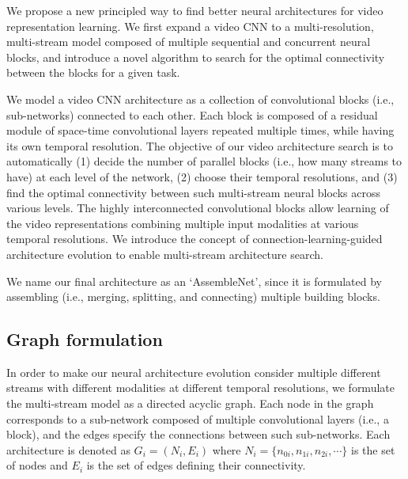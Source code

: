 \documentclass{article} \usepackage{iclr2020_conference,times}
\begin{document}
We propose a new principled way to find better neural architectures for video representation learning. We first expand a video CNN to a multi-resolution, multi-stream model composed of multiple sequential and concurrent neural blocks, and introduce a novel algorithm to search for the optimal connectivity between the blocks for a given task.




We model a video CNN architecture as a collection of convolutional blocks (i.e., sub-networks) connected to each other.
Each block is composed of a residual module of space-time convolutional layers repeated multiple times, while having its own temporal resolution. 
The objective of our video architecture search is to automatically (1) decide the number of parallel blocks (i.e., how many streams to have) at each level of the network, (2) choose their temporal resolutions, and (3) find the optimal connectivity between such multi-stream neural blocks across various levels. 
The highly interconnected convolutional blocks allow learning of the video representations combining multiple input modalities at various temporal resolutions. We introduce the concept of connection-learning-guided architecture evolution to enable multi-stream architecture search.



















We name our final architecture as an `AssembleNet', since it is formulated by assembling (i.e., merging, splitting, and connecting) multiple building blocks. 







\subsection{Graph formulation}

In order to make our neural architecture evolution consider multiple different streams with different modalities at different temporal resolutions, we formulate the multi-stream model as a directed acyclic graph. Each node in the graph corresponds to a sub-network composed of multiple convolutional layers (i.e., a block), and the edges specify the connections between such sub-networks. Each architecture is denoted as $G_i = (N_i, E_i)$ where $N_i = \{n_{0i}, n_{1i}, n_{2i},\cdots\}$ is the set of nodes and $E_i$ is the set of edges defining their connectivity.
\end{document}
